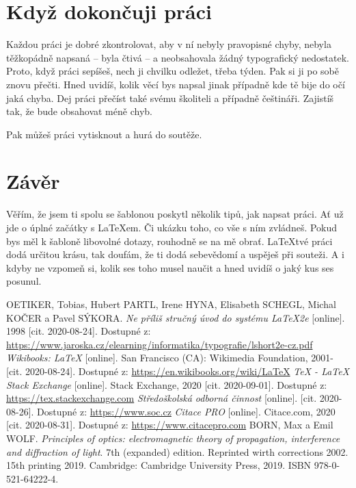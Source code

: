 \documentclass[12pt, a4paper,
 twoside,        %
 openright
]{report}
\newif\ifusebiblatex \usebiblatexfalse %
\begin{document}
\chapter{Když dokončuji práci}

Každou práci je dobré zkontrolovat, aby v ní nebyly pravopisné chyby, nebyla těžkopádně napsaná -- byla čtivá -- a neobsahovala žádný typografický nedostatek. Proto, když práci sepíšeš, nech ji chvilku odležet, třeba týden. Pak si ji po sobě znovu přečti. Hned uvidíš, kolik věcí bys napsal jinak případně kde tě bije do očí jaká chyba. Dej práci přečíst také svému školiteli a případně češtináři. Zajistíš tak, že bude obsahovat méně chyb.

Pak můžeš práci vytisknout a hurá do soutěže.

\chapter*{Závěr}

Věřím, že jsem ti spolu se šablonou poskytl několik tipů, jak napsat práci. Ať už jde o úplné začátky s \LaTeX{}em. Či ukázku toho, co vše s ním zvládneš. Pokud bys měl k šabloně libovolné dotazy, rouhodně se na mě obrať. \LaTeX tvé práci dodá určitou krásu, tak doufám, že ti dodá sebevědomí a uspěješ při souteži. A i kdyby ne vzpomeň si, kolik ses toho musel naučit a hned uvidíš o jaký kus ses posunul.

\ifusebiblatex
    \printbibliography
\else
    \begin{thebibliography}{99}
        OETIKER, Tobias, Hubert PARTL, Irene HYNA, Elisabeth SCHEGL, Michal KOČER a Pavel SÝKORA. \textit{Ne příliš stručný úvod do systému LaTeX2e} [online]. 1998 [cit. 2020-08-24]. Dostupné z: \url{https://www.jaroska.cz/elearning/informatika/typografie/lshort2e-cz.pdf}
        \textit{Wikibooks: LaTeX} [online]. San Francisco (CA): Wikimedia Foundation, 2001- [cit. 2020-08-24]. Dostupné z: \url{https://en.wikibooks.org/wiki/LaTeX}
         \textit{TeX - LaTeX Stack Exchange} [online]. Stack Exchange, 2020 [cit. 2020-09-01]. Dostupné z: \url{https://tex.stackexchange.com}
         \textit{Středoškolská odborná činnost} [online]. [cit. 2020-08-26]. Dostupné z: \url{https://www.soc.cz}
        \textit{Citace PRO} [online]. Citace.com, 2020 [cit. 2020-08-31]. Dostupné z: \url{https://www.citacepro.com}
         BORN, Max a Emil WOLF. \textit{Principles of optics: electromagnetic theory of propagation, interference and diffraction of light}. 7th (expanded) edition. Reprinted wirth corrections 2002. 15th printing 2019. Cambridge: Cambridge University Press, 2019. ISBN 978-0-521-64222-4.
    \end{thebibliography}
\fi
\end{document}
